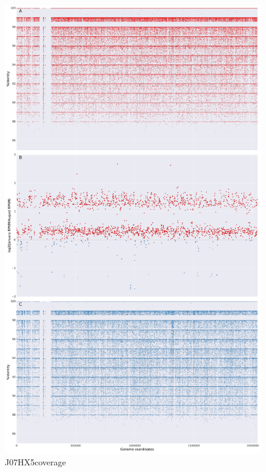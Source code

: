 \begin{figure}[!hbtp]
  \centering
  \includegraphics[width=\textwidth,height=\textheight,keepaspectratio]{Chapter5/Figures/coverage_plots/J07HX5_coverage.pdf}
  \caption{J07HX5coverage}
  \label{J07HX5coverage}
\end{figure}

